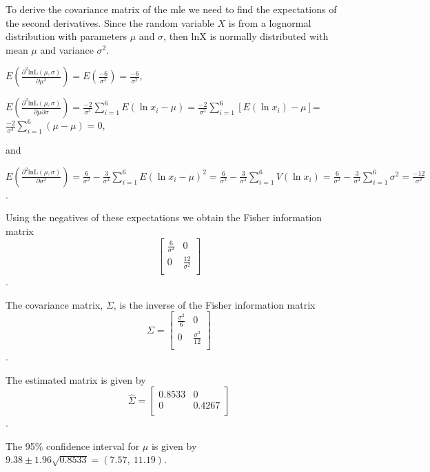 \documentclass[]{book}
\begin{document}
To derive the covariance matrix of the mle we need to find the
expectations of the second derivatives. Since the random variable \(X\)
is from a lognormal distribution with parameters \(\mu\) and \(\sigma\),
then \(\text{lnX}\) is normally distributed with mean \(\mu\) and
variance \(\sigma^{2}\).

\(E\left( \frac{\partial^{2}\text{lnL}\left( \mu,\sigma \right)}{\partial\mu^{2}} \right) = E\left( \frac{- 6}{\sigma^{2}} \right) = \frac{- 6}{\sigma^{2}}\),

\(E\left( \frac{\partial^{2}\text{lnL}\left( \mu,\sigma \right)}{\partial\mu\partial\sigma} \right) = \frac{- 2}{\sigma^{3}}\sum_{i = 1}^{6}{E\left( \ln x_{i} - \mu \right)} = \frac{- 2}{\sigma^{3}}\sum_{i = 1}^{6}\left\lbrack E\left( \ln x_{i} \right) - \mu \right\rbrack\)=\(\frac{- 2}{\sigma^{3}}\sum_{i = 1}^{6}\left( \mu - \mu \right) = 0\),

and

\(E\left( \frac{\partial^{2}\text{lnL}\left( \mu,\sigma \right)}{\partial\sigma^{2}} \right) = \frac{6}{\sigma^{2}} - \frac{3}{\sigma^{4}}\sum_{i = 1}^{6}{E\left( \ln x_{i} - \mu \right)}^{2} = \frac{6}{\sigma^{2}} - \frac{3}{\sigma^{4}}\sum_{i = 1}^{6}{V\left( \ln x_{i} \right) = \frac{6}{\sigma^{2}} - \frac{3}{\sigma^{4}}\sum_{i = 1}^{6}{\sigma^{2} = \frac{- 12}{\sigma^{2}}}}\).

Using the negatives of these expectations we obtain the Fisher
information matrix \[\begin{bmatrix}
\frac{6}{\sigma^{2}} & 0 \\
0 & \frac{12}{\sigma^{2}} \\
\end{bmatrix}\].

The covariance matrix, \(\Sigma\), is the inverse of the Fisher
information matrix \[\Sigma = \begin{bmatrix}
\frac{\sigma^{2}}{6} & 0 \\
0 & \frac{\sigma^{2}}{12} \\
\end{bmatrix}\].

The estimated matrix is given by \[\hat{\Sigma} = \begin{bmatrix}
0.8533 & 0 \\
0 & 0.4267 \\
\end{bmatrix}\].

The 95\% confidence interval for \(\mu\) is given by
\(9.38 \pm 1.96\sqrt{0.8533} = \left( 7.57,\ 11.19 \right)\).
\end{document}
